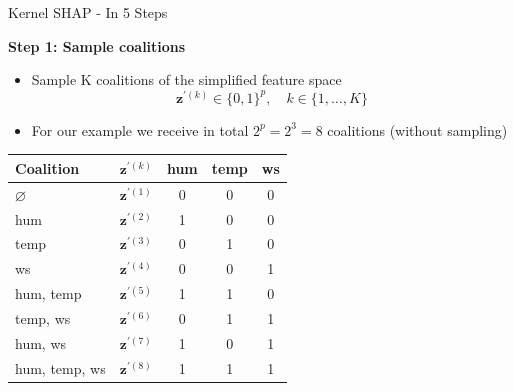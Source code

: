 \documentclass[11pt,compress,t,notes=noshow, aspectratio=169, xcolor=table]{beamer}
\begin{document}
\begin{vbframe}{Kernel SHAP - In 5 Steps}


\textbf{Step 1: Sample coalitions}
\begin{itemize}
    \item Sample K coalitions of the simplified feature space
    $$\mathbf{z}^{\prime (k)} \in\{0,1\}^{p}, \quad k \in\{1, \ldots, K\}$$
    \item For our example we receive in total $2^p = 2^3 = 8$ coalitions (without sampling)
\end{itemize}

\begin{table}[]
    \centering
     \begin{tabular}{l |c|ccc}
  Coalition  & $\mathbf{z}^{\prime (k)}$ &  hum & temp & ws \\
  \hline 
  $\varnothing$ & $\mathbf{z}^{\prime (1)}$ & 0 & 0 & 0  \\
  hum & $\mathbf{z}^{\prime (2)}$ & 1 & 0 & 0  \\
  temp &  $\mathbf{z}^{\prime (3)}$ & 0 & 1 & 0  \\
  ws &   $\mathbf{z}^{\prime (4)}$ & 0 & 0 & 1  \\
  hum, temp & $\mathbf{z}^{\prime (5)}$ & 1 & 1 & 0  \\
  temp, ws & $\mathbf{z}^{\prime (6)}$ & 0 & 1 & 1  \\
  hum, ws &   $\mathbf{z}^{\prime (7)}$ & 1 & 0 & 1  \\
  hum, temp, ws & $\mathbf{z}^{\prime (8)}$ & 1 & 1 & 1  \\
  
 
  \end{tabular}
\end{table}

\end{vbframe}
\end{document}
